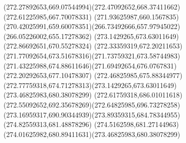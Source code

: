 {{		\curveto(272.27892653,669.07544994)(272.47092652,668.37411662)(272.61225985,667.70078331)
		\lineto(271.93625987,660.1567835)
		\curveto(270.42025991,659.60078351)(266.73492666,657.97945022)(266.05226002,655.17278362)
		\moveto(273.1429265,673.63011649)
		\lineto(272.86692651,670.55278324)
		\curveto(272.33359319,672.20211653)(271.77092654,673.51678316)(271.73759321,673.58744983)
		\curveto(271.43225988,674.88611646)(271.69492654,676.0767831)(272.20292653,677.10478307)
		\curveto(272.46825985,675.88344977)(272.77759318,674.71278313)(273.1429265,673.63011649)
		\moveto(273.46825983,680.38078299)
		\curveto(272.61759318,686.01011618)(272.55092652,692.35678269)(272.64825985,696.73278258)
		\curveto(273.16959317,690.90344939)(273.89359315,684.78344955)(274.82559313,681.48878296)
		\curveto(274.5162598,681.27144963)(274.01625982,680.89411631)(273.46825983,680.38078299)
	}
}
